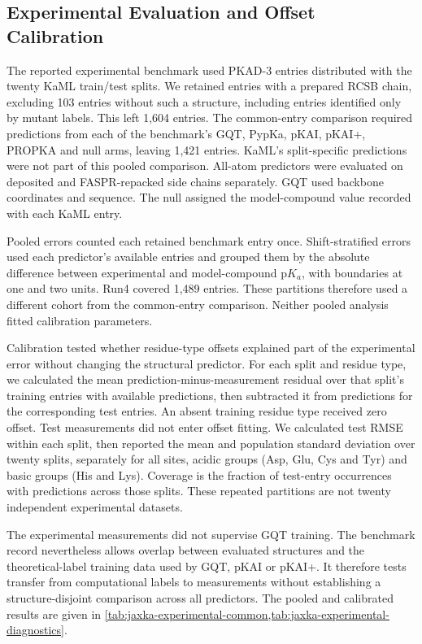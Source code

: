 \subsection{Experimental Evaluation and Offset Calibration}
\label{app:jaxka-experimental-evaluation}

The reported experimental benchmark used PKAD-3 entries distributed with the twenty KaML train/test splits.\supercite{shenKaMLsPredictingProtein2025} We retained entries with a prepared RCSB chain, excluding 103 entries without such a structure, including entries identified only by mutant labels. This left 1,604 entries. The common-entry comparison required predictions from each of the benchmark's GQT, PypKa, pKAI, pKAI+, PROPKA and null arms, leaving 1,421 entries. KaML's split-specific predictions were not part of this pooled comparison. All-atom predictors were evaluated on deposited and FASPR-repacked side chains separately. GQT used backbone coordinates and sequence. The null assigned the model-compound value recorded with each KaML entry.

Pooled errors counted each retained benchmark entry once. Shift-stratified errors used each predictor's available entries and grouped them by the absolute difference between experimental and model-compound $\mathrm{p}K_a$, with boundaries at one and two units. Run4 covered 1,489 entries. These partitions therefore used a different cohort from the common-entry comparison. Neither pooled analysis fitted calibration parameters.

Calibration tested whether residue-type offsets explained part of the experimental error without changing the structural predictor. For each split and residue type, we calculated the mean prediction-minus-measurement residual over that split's training entries with available predictions, then subtracted it from predictions for the corresponding test entries. An absent training residue type received zero offset. Test measurements did not enter offset fitting. We calculated test RMSE within each split, then reported the mean and population standard deviation over twenty splits, separately for all sites, acidic groups (Asp, Glu, Cys and Tyr) and basic groups (His and Lys). Coverage is the fraction of test-entry occurrences with predictions across those splits. These repeated partitions are not twenty independent experimental datasets.

The experimental measurements did not supervise GQT training. The benchmark record nevertheless allows overlap between evaluated structures and the theoretical-label training data used by GQT, pKAI or pKAI+. It therefore tests transfer from computational labels to measurements without establishing a structure-disjoint comparison across all predictors. The pooled and calibrated results are given in \cref{tab:jaxka-experimental-common,tab:jaxka-experimental-diagnostics}.
